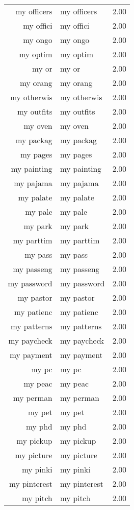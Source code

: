 \begin{table}[ht]
\begin{tabular}{rlr}
  my officers & my officers & 2.00 \\ 
  my offici & my offici & 2.00 \\ 
  my ongo & my ongo & 2.00 \\ 
  my optim & my optim & 2.00 \\ 
  my or & my or & 2.00 \\ 
  my orang & my orang & 2.00 \\ 
  my otherwis & my otherwis & 2.00 \\ 
  my outfits & my outfits & 2.00 \\ 
  my oven & my oven & 2.00 \\ 
  my packag & my packag & 2.00 \\ 
  my pages & my pages & 2.00 \\ 
  my painting & my painting & 2.00 \\ 
  my pajama & my pajama & 2.00 \\ 
  my palate & my palate & 2.00 \\ 
  my pale & my pale & 2.00 \\ 
  my park & my park & 2.00 \\ 
  my parttim & my parttim & 2.00 \\ 
  my pass & my pass & 2.00 \\ 
  my passeng & my passeng & 2.00 \\ 
  my password & my password & 2.00 \\ 
  my pastor & my pastor & 2.00 \\ 
  my patienc & my patienc & 2.00 \\ 
  my patterns & my patterns & 2.00 \\ 
  my paycheck & my paycheck & 2.00 \\ 
  my payment & my payment & 2.00 \\ 
  my pc & my pc & 2.00 \\ 
  my peac & my peac & 2.00 \\ 
  my perman & my perman & 2.00 \\ 
  my pet & my pet & 2.00 \\ 
  my phd & my phd & 2.00 \\ 
  my pickup & my pickup & 2.00 \\ 
  my picture & my picture & 2.00 \\ 
  my pinki & my pinki & 2.00 \\ 
  my pinterest & my pinterest & 2.00 \\ 
  my pitch & my pitch & 2.00 \\ 

\end{tabular}
\end{table}
